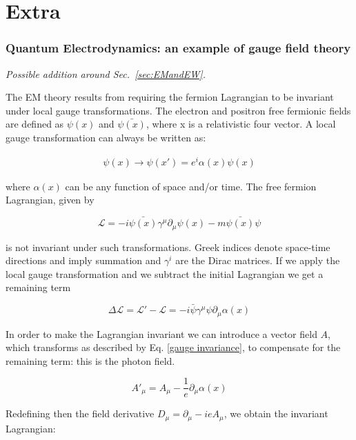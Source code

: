 \chapter{Extra}

\subsection{Quantum Electrodynamics: an example of gauge field theory }

{\em Possible addition around Sec.~\ref{sec:EMandEW}.}



The EM theory results from requiring the fermion Lagrangian to be invariant under local gauge transformations.
The electron and positron free fermionic fields are defined as $\psi(x)$ and $\bar{\psi(x)}$, where x is a relativistic four vector.
A local gauge transformation can always be written as:

\begin{align}
\psi(x) \rightarrow \psi(x') = e^i{\alpha(x)}\psi(x)
\end{align}

where $\alpha(x)$ can be any function of space and/or time. The free fermion Lagrangian, given by

\begin{equation}
\mathcal{L} = -i \bar{\psi(x)} \gamma^{\mu} \partial_\mu \psi(x) - m\bar{\psi(x)} \psi
\end{equation}

is not invariant under such transformations. Greek indices denote space-time directions and imply summation and $\gamma^i$ are the Dirac matrices. If we apply the local gauge transformation and we subtract the initial Lagrangian we get a remaining term

\begin{equation}
\Delta \mathcal{L} = \mathcal{L}' - \mathcal{L} = -i \bar{\psi}  \gamma^{\mu} \psi \partial_\mu \alpha(x)
\end{equation}

In order to make the Lagrangian invariant we can introduce a vector field $A$, which transforms as described by Eq. \ref{gauge invariance},  to compensate for the remaining term: this is the photon field.

\begin{equation}
\label{gauge invariance}
A'_\mu = A_\mu -\frac{1}{e}\partial_\mu \alpha(x)
\end{equation}

Redefining then the field derivative $D_\mu = \partial_\mu - ieA_\mu$, we obtain the invariant Lagrangian:

